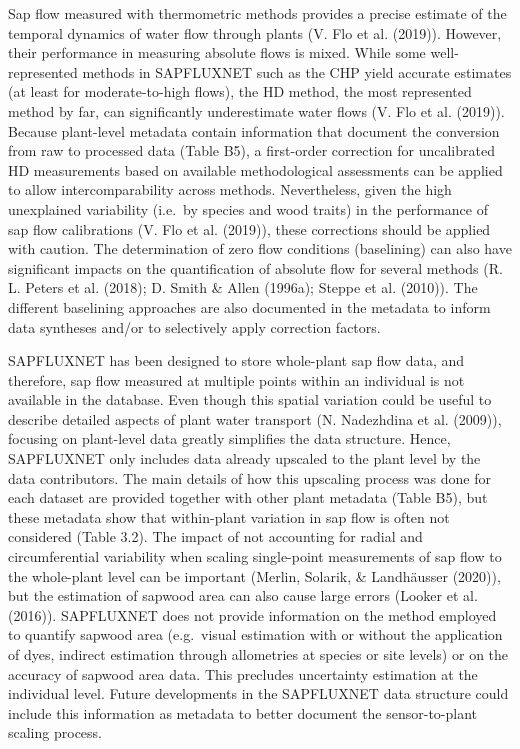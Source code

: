 \documentclass[11pt,twoside]{reedthesis}
\begin{document}
Sap flow measured with thermometric methods provides a precise estimate
of the temporal dynamics of water flow through plants (V. Flo et al.
(2019)). However, their performance in measuring absolute flows is
mixed. While some well-represented methods in SAPFLUXNET such as the CHP
yield accurate estimates (at least for moderate-to-high flows), the HD
method, the most represented method by far, can significantly
underestimate water flows (V. Flo et al. (2019)). Because plant-level
metadata contain information that document the conversion from raw to
processed data (Table B5), a first-order correction for uncalibrated HD
measurements based on available methodological assessments can be
applied to allow intercomparability across methods. Nevertheless, given
the high unexplained variability (i.e.~by species and wood traits) in
the performance of sap flow calibrations (V. Flo et al. (2019)), these
corrections should be applied with caution. The determination of zero
flow conditions (baselining) can also have significant impacts on the
quantification of absolute flow for several methods (R. L. Peters et al.
(2018); D. Smith \& Allen (1996a); Steppe et al. (2010)). The different
baselining approaches are also documented in the metadata to inform data
syntheses and/or to selectively apply correction factors.\par

SAPFLUXNET has been designed to store whole-plant sap flow data, and
therefore, sap flow measured at multiple points within an individual is
not available in the database. Even though this spatial variation could
be useful to describe detailed aspects of plant water transport (N.
Nadezhdina et al. (2009)), focusing on plant-level data greatly
simplifies the data structure. Hence, SAPFLUXNET only includes data
already upscaled to the plant level by the data contributors. The main
details of how this upscaling process was done for each dataset are
provided together with other plant metadata (Table B5), but these
metadata show that within-plant variation in sap flow is often not
considered (Table 3.2). The impact of not accounting for radial and
circumferential variability when scaling single-point measurements of
sap flow to the whole-plant level can be important (Merlin, Solarik, \&
Landhäusser (2020)), but the estimation of sapwood area can also cause
large errors (Looker et al. (2016)). SAPFLUXNET does not provide
information on the method employed to quantify sapwood area (e.g.~visual
estimation with or without the application of dyes, indirect estimation
through allometries at species or site levels) or on the accuracy of
sapwood area data. This precludes uncertainty estimation at the
individual level. Future developments in the SAPFLUXNET data structure
could include this information as metadata to better document the
sensor-to-plant scaling process.\par
\end{document}
